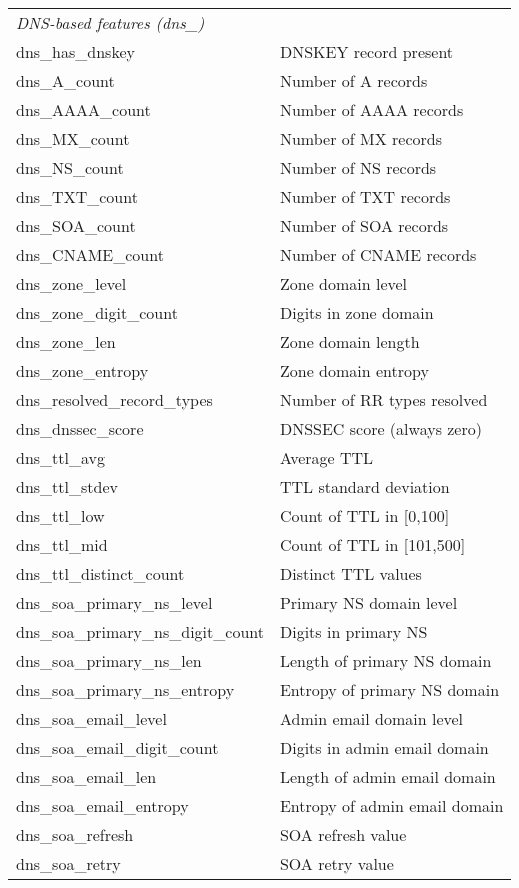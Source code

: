 \begin{longtable}{@{}ll@{}}
\midrule
\multicolumn{2}{l}{\emph{DNS-based features (dns\_)}} \\
dns\_has\_dnskey & DNSKEY record present \\
dns\_A\_count & Number of A records \\
dns\_AAAA\_count & Number of AAAA records \\
dns\_MX\_count & Number of MX records \\
dns\_NS\_count & Number of NS records \\
dns\_TXT\_count & Number of TXT records \\
dns\_SOA\_count & Number of SOA records \\
dns\_CNAME\_count & Number of CNAME records \\
dns\_zone\_level & Zone domain level \\
dns\_zone\_digit\_count & Digits in zone domain \\
dns\_zone\_len & Zone domain length \\
dns\_zone\_entropy & Zone domain entropy \\
dns\_resolved\_record\_types & Number of RR types resolved \\
dns\_dnssec\_score & DNSSEC score (always zero) \\
dns\_ttl\_avg & Average TTL \\
dns\_ttl\_stdev & TTL standard deviation \\
dns\_ttl\_low & Count of TTL in [0,100] \\
dns\_ttl\_mid & Count of TTL in [101,500] \\
dns\_ttl\_distinct\_count & Distinct TTL values \\
dns\_soa\_primary\_ns\_level & Primary NS domain level \\
dns\_soa\_primary\_ns\_digit\_count & Digits in primary NS \\
dns\_soa\_primary\_ns\_len & Length of primary NS domain \\
dns\_soa\_primary\_ns\_entropy & Entropy of primary NS domain \\
dns\_soa\_email\_level & Admin email domain level \\
dns\_soa\_email\_digit\_count & Digits in admin email domain \\
dns\_soa\_email\_len & Length of admin email domain \\
dns\_soa\_email\_entropy & Entropy of admin email domain \\
dns\_soa\_refresh & SOA refresh value \\
dns\_soa\_retry & SOA retry value \\

\end{longtable}
